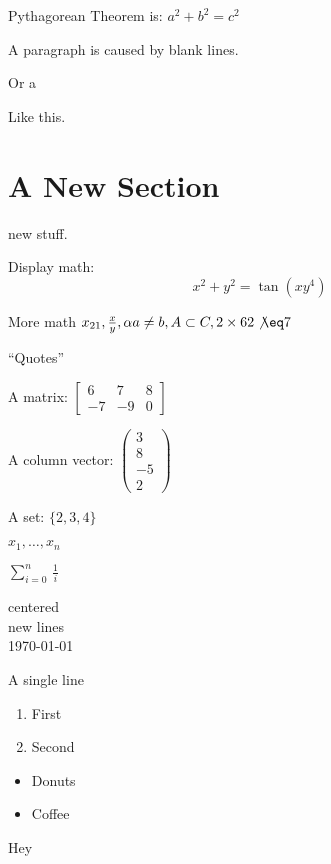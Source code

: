 \documentclass[12pt]{article}
\begin{document}
Pythagorean Theorem is: \(a^2 + b^2 = c^2\)

A paragraph is caused by blank lines.

Or a \par Like this.
\section{A New Section}

new stuff.

Display math: \[x^2+y^2=\tan(xy^4)\]


More math \(x_{21}, \frac{x}{y}, \alpha a \neq b, A \subset C, 2\times 6 2\not\eq 7\)

``Quotes''

A matrix:
\(\begin{bmatrix}
6 & 7 & 8\\
-7 & -9 & 0
\end{bmatrix}\)

A column vector:
\(\begin{pmatrix}
3\\
8\\
-5\\
2
\end{pmatrix}\)

A set: \(\{2,3,4\}\)

\(x_1, \ldots, x_n\)

\(\sum_{i=0}^{n}\,\frac{1}{i}\)

\begin{center}
centered\\
new lines\\
\today
\end{center}
\centerline{A single line}

\begin{enumerate}
\item First
\item Second
\end{enumerate}

\begin{itemize}
\item Donuts
\item Coffee
\end{itemize}

\newpage

Hey
\end{document}
